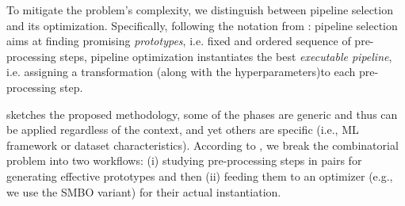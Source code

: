 To mitigate the problem's complexity, we distinguish between pipeline selection and its optimization.
Specifically, following the notation from \cite{Quemy20InfSystems}:
pipeline selection aims at finding promising \textit{prototypes}, i.e. fixed and ordered sequence of pre-processing steps, pipeline optimization instantiates the best \textit{executable pipeline}, i.e. assigning a transformation (along with the hyperparameters)to each pre-processing step.


 sketches the proposed methodology, some of the phases are generic and thus can be applied regardless of the context, and yet others are specific (i.e., ML framework or dataset characteristics).
According to \cite{Quemy20InfSystems}, we break the combinatorial problem into two workflows: (i) studying pre-processing steps in pairs for generating effective prototypes and then (ii) feeding them to an optimizer (e.g., we use the SMBO \cite{HyperOptICML13} variant) for their actual instantiation.


